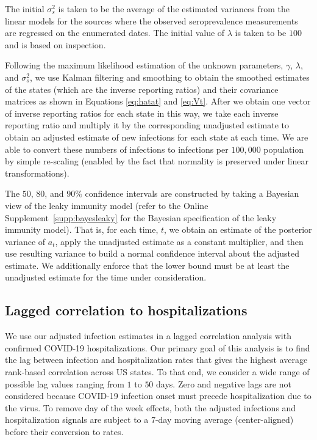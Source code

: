 \documentclass{article}
\begin{document}
The initial $\sigma^2_s$ is taken to be the average of the estimated variances from the linear models for the sources where the observed seroprevalence measurements are regressed on the enumerated dates. The initial value of $\lambda$ is taken to be $100$ and is based on inspection. 

Following the maximum likelihood estimation of the unknown parameters, $\gamma$, $\lambda$, and $\sigma^2_s$, we use Kalman filtering and smoothing to obtain the smoothed estimates of the states (which are the inverse reporting ratios) and their covariance matrices as shown in Equations \ref{eq:hatat} and \ref{eq:Vt}. After we obtain one vector of inverse reporting ratios for each state in this way, we take each inverse reporting ratio and multiply it by the corresponding unadjusted estimate to obtain an adjusted estimate of new infections for each state at each time. We are able to convert these numbers of infections to infections per $100,000$ population by simple re-scaling (enabled by the fact that normality is preserved under linear transformations).

The $50$, $80$, and $90\%$ confidence intervals are constructed by taking a Bayesian view of the leaky immunity model (refer to the Online Supplement~\ref{supp:bayesleaky} for the Bayesian specification of the leaky immunity model). That is, for each time, $t$, we obtain an estimate of the posterior variance of $a_t$, apply the unadjusted estimate as a constant multiplier, and then use resulting variance to build a normal confidence interval about the adjusted estimate. We additionally enforce that the lower bound must be at least the unadjusted estimate for the time under consideration.

\subsection{Lagged correlation to hospitalizations} We use our adjusted infection estimates in a lagged correlation analysis with confirmed COVID-19 hospitalizations. Our primary goal of this analysis is to find the lag between infection and hospitalization rates that gives the highest average rank-based correlation across US states. To that end, we consider a wide range of possible lag values ranging from $1$ to $50$ days. Zero and negative lags are not considered because COVID-19 infection onset must precede hospitalization due to the virus. To remove day of the week effects, both the adjusted infections and hospitalization signals are subject to a $7$-day moving average (center-aligned) before their conversion to rates.
\end{document}

